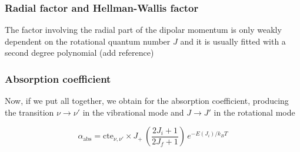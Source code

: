 \subsubsection{Radial factor and Hellman-Wallis factor}
\label{S:radial-factor}
The factor involving the radial part of the dipolar momentum is only weakly dependent on the rotational quantum number $J$ and it is usually fitted with a second degree polynomial (add reference)

\subsubsection{Absorption coefficient}
\label{S:absorpt-coeff}

Now, if we put all together, we obtain for the absorption coefficient, producing the transition $\nu \to \nu'$ in the vibrational mode and $J \to J'$ in the rotational mode

\begin{equation}
  \label{Q:absorption-coeff-J}
  \alpha_{\text{abs}} = \text{cte}_{\nu,\nu'} \times J_{+}\, \left( \frac{2 J_{i}+1}{2 J_{f}+1}\right)\, e^{-E(J_{i})/k_{B}T} 
\end{equation}



